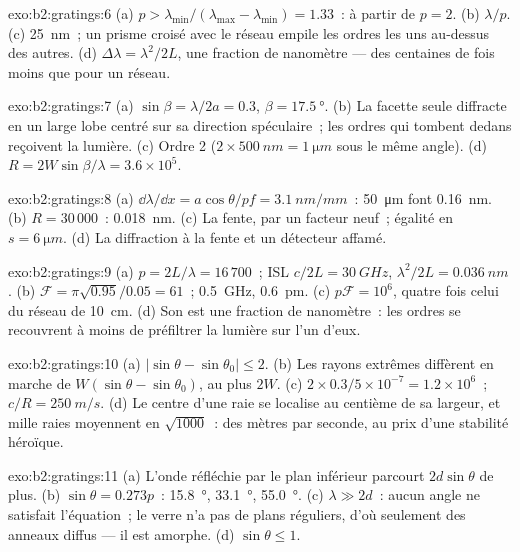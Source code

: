 \begin{solution}{exo:b2:gratings:6}
(a) $p > \lambda_{\min}/(\lambda_{\max} - \lambda_{\min}) = 1.33$~: à partir de $p = 2$. (b) $\lambda/p$. (c)
\qty{25}{nm}~; un prisme croisé avec le réseau empile les ordres les uns au-dessus
des autres. (d) $\Delta\lambda = \lambda^2/2L$, une fraction de nanomètre --- des centaines
de fois moins que pour un réseau.
\end{solution}

\begin{solution}{exo:b2:gratings:7}
(a) $\sin\beta = \lambda/2a = 0.3$, $\beta = \qty{17.5}{\degree}$. (b) La facette seule diffracte
en un large lobe centré sur sa direction spéculaire~; les ordres qui
tombent dedans reçoivent la lumière. (c) Ordre 2 ($2 \times \qty{500}{nm} = \qty{1}{\micro m}$ sous
le même angle). (d) $R = 2W\sin\beta/\lambda = 3.6 \times 10^5$.
\end{solution}

\begin{solution}{exo:b2:gratings:8}
(a) $\dd\lambda/\dd x = a\cos\theta/pf = \qty{3.1}{nm/mm}$~: \qty{50}{\micro m} font \qty{0.16}{nm}. (b)
$R = 30\,000$~: \qty{0.018}{nm}. (c) La fente, par un facteur neuf~; égalité en $s = \qty{6}{\micro m}$.
(d) La diffraction à la fente et un détecteur affamé.
\end{solution}

\begin{solution}{exo:b2:gratings:9}
(a) $p = 2L/\lambda = 16\,700$~; ISL $c/2L = \qty{30}{GHz}$, $\lambda^2/2L = \qty{0.036}{nm}$. (b) $\mathcal F
= \pi\sqrt{0.95}/0.05 = 61$~; \qty{0.5}{GHz}, \qty{0.6}{pm}. (c) $p\mathcal F = 10^6$, quatre
fois celui du réseau de \qty{10}{cm}. (d) Son  est une fraction
de nanomètre~: les ordres se recouvrent à moins de préfiltrer la lumière
sur l'un d'eux.
\end{solution}

\begin{solution}{exo:b2:gratings:10}
(a) $|\sin\theta - \sin\theta_0| \le 2$. (b) Les rayons extrêmes diffèrent en marche de
$W(\sin\theta - \sin\theta_0)$, au plus $2W$. (c) $2 \times 0.3/5 \times 10^{-7} = 1.2 \times 10^6$~; $c/R
= \qty{250}{m/s}$. (d) Le centre d'une raie se localise au centième de sa
largeur, et mille raies moyennent en $\sqrt{1000}$~: des mètres par
seconde, au prix d'une stabilité héroïque.
\end{solution}

\begin{solution}{exo:b2:gratings:11}
(a) L'onde réfléchie par le plan inférieur parcourt $2d\sin\theta$ de plus.
(b) $\sin\theta = 0.273p$~: \qty{15.8}{\degree}, \qty{33.1}{\degree}, \qty{55.0}{\degree}. (c) $\lambda \gg 2d$~:
aucun angle ne satisfait l'équation~; le verre n'a pas de plans réguliers, d'où
seulement des anneaux diffus --- il est amorphe. (d) $\sin\theta \le 1$.
\end{solution}

